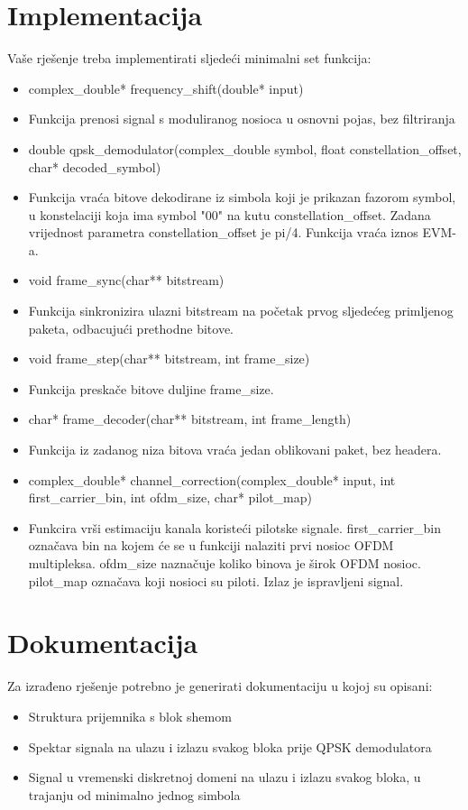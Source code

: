 \documentclass[a4paper]{article}
\begin{document}
\section{Implementacija}

Vaše rješenje treba implementirati sljedeći minimalni set funkcija:
\begin{itemize}
\item complex\_double* frequency\_shift(double* input)
\item[] Funkcija prenosi signal s moduliranog nosioca u osnovni pojas, bez filtriranja
\item double qpsk\_demodulator(complex\_double symbol, float constellation\_offset, char* decoded\_symbol)
\item[] Funkcija vraća bitove dekodirane iz simbola koji je prikazan fazorom symbol, u konstelaciji koja ima symbol "00" na kutu constellation\_offset. Zadana vrijednost parametra constellation\_offset je pi/4. Funkcija vraća iznos EVM-a.
\item void frame\_sync(char** bitstream)
\item[] Funkcija sinkronizira ulazni bitstream na početak prvog sljedećeg primljenog paketa, odbacujući prethodne bitove.
\item void frame\_step(char** bitstream, int frame\_size)
\item[] Funkcija preskače bitove duljine frame\_size.
\item char* frame\_decoder(char** bitstream, int frame\_length)
\item[] Funkcija iz zadanog niza bitova vraća jedan oblikovani paket, bez headera.
\item complex\_double* channel\_correction(complex\_double* input, int first\_carrier\_bin, int ofdm\_size, char* pilot\_map)
\item[] Funkcira vrši estimaciju kanala koristeći pilotske signale. first\_carrier\_bin označava bin na kojem će se u funkciji nalaziti prvi nosioc OFDM multipleksa. ofdm\_size naznačuje koliko binova je širok OFDM nosioc. pilot\_map označava koji nosioci su piloti. Izlaz je ispravljeni signal.
\end{itemize}

\section{Dokumentacija}

Za izrađeno rješenje potrebno je generirati dokumentaciju u kojoj su opisani:
\begin{itemize}
\item Struktura prijemnika s blok shemom
\item Spektar signala na ulazu i izlazu svakog bloka prije QPSK demodulatora
\item Signal u vremenski diskretnoj domeni na ulazu i izlazu svakog bloka, u trajanju od minimalno jednog simbola
\end{itemize}
\end{document}
